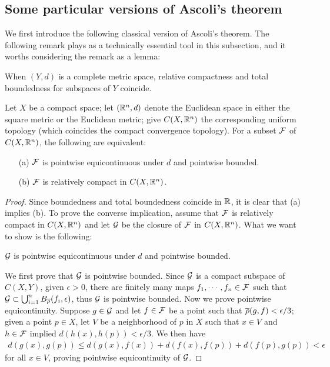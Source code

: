 \subsection{Some particular versions of Ascoli's theorem}

We first introduce the following classical version of Ascoli's theorem.
The following remark plays as a technically essential tool in this subsection, and it worths considering the remark as a lemma:
\begin{rmk}
    When $(Y, d)$ is a complete metric space, relative compactness and total boundedness for subspaces of $Y$ coincide.
\end{rmk}
\begin{thm}
    Let $X$ be a compact space; let $({\mathbb{R}}^n, d)$ denote the Euclidean space in either the square metric or the Euclidean metric; give $C(X, {\mathbb{R}}^n)$ the corresponding uniform topology (which coincides the compact convergence topology).
    For a subset ${\mathcal{F}}$ of $C(X, {\mathbb{R}}^n)$, the following are equivalent:
    \begin{enumerate}
        \item[(a)]
        {
            ${\mathcal{F}}$ is pointwise equicontinuous under $d$ and pointwise bounded.
        }
        \item[(b)]
        {
            ${\mathcal{F}}$ is relatively compact in $C(X, {\mathbb{R}}^n)$.
        }
    \end{enumerate}
\end{thm}
\begin{proof}
    Since boundedness and total boundedness coincide in ${\mathbb{R}}$, it is clear that (a) implies (b).
    To prove the converse implication, assume that ${\mathcal{F}}$ is relatively compact in $C(X, {\mathbb{R}}^n)$ and let ${\mathcal{G}}$ be the closure of ${\mathcal{F}}$ in $C(X, {\mathbb{R}}^n)$.
    What we want to show is the following:
    \begin{center}
        ${\mathcal{G}}$ is pointwise equicontinuous under $d$ and pointwise bounded.
    \end{center}
    We first prove that ${\mathcal{G}}$ is pointwise bounded.
    Since ${\mathcal{G}}$ is a compact subspace of $C(X, Y)$, given $\epsilon>0$, there are finitely many maps $f_1, \cdots, f_n\in{\mathcal{F}}$ such that ${\mathcal{G}}\subset\bigcup_{i=1}^n B_{\overline{\rho}}(f_i, \epsilon)$, thus ${\mathcal{G}}$ is pointwise bounded.
    Now we prove pointwise equicontinuity.
    Suppose $g\in{\mathcal{G}}$ and let $f\in{\mathcal{F}}$ be a point such that $\overline{\rho}(g, f)<\epsilon/3$; given a point $p\in X$, let $V$ be a neighborhood of $p$ in $X$ such that $x\in V$ and $h\in{\mathcal{F}}$ implied $d(h(x), h(p))<\epsilon/3$.
    We then have
    \begin{align*}
        d(g(x), g(p))\leq d(g(x), f(x))+d(f(x), f(p))+d(f(p), g(p))<\epsilon
    \end{align*}
    for all $x\in V$, proving pointwise equicontinuity of ${\mathcal{G}}$.
\end{proof}
